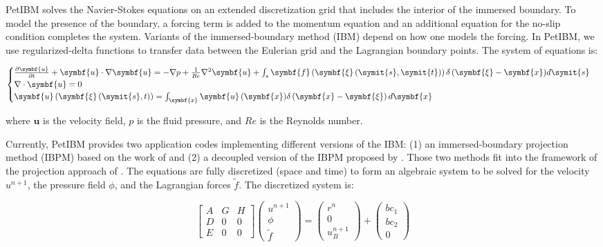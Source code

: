 PetIBM solves the Navier-Stokes equations on an extended discretization grid that includes the interior of the immersed boundary.
To model the presence of the boundary, a forcing term is added to the momentum equation and an additional equation for the no-slip condition completes the system.
Variants of the immersed-boundary method (IBM) depend on how one models the forcing.
In PetIBM, we use regularized-delta functions to transfer data between the Eulerian grid and the Lagrangian boundary points.
The system of equations is:

\begin{equation}
\begin{cases}
\frac{\partial \symbf{u}}{\partial t} + \symbf{u} \cdot \nabla \symbf{u} = -\nabla p + \frac{1}{Re} \nabla^2 \symbf{u} + \int_{s}{\symbf{f} \left( \symbf{\xi} \left( \symit{s}, \symit{t} \right) \right) \delta \left( \symbf{\xi} - \symbf{x} \right)} d\symit{s} \\
\nabla \cdot \symbf{u} = 0 \\
\symbf{u} \left( \symbf{\xi} \left( \symit{s}, t \right) \right) = \int_{\symbf{x}}{\symbf{u} \left( \symbf{x} \right)} \delta \left( \symbf{x} - \symbf{\xi} \right) d\symbf{x}
\end{cases}
\end{equation}

where $\symbf{u}$ is the velocity field, $p$ is the fluid pressure, and $Re$ is the Reynolds number.

Currently, PetIBM provides two application codes implementing different versions of the IBM: (1) an immersed-boundary projection method (IBPM) based on the work of \cite{taira_colonius_2007} and (2) a decoupled version of the IBPM proposed by \cite{li_et_al_2016}.
Those two methods fit into the framework of the projection approach of \cite{perot_1993}.
The equations are fully discretized (space and time) to form an algebraic system to be solved for the velocity $u^{n+1}$, the pressure field $\phi$, and the Lagrangian forces $\tilde{f}$.
The discretized system is:

\begin{equation}
\left[
\begin{matrix}
A & G & H \\
D & 0 & 0 \\
E & 0 & 0
\end{matrix}
\right]
\left(
\begin{matrix}
u^{n+1} \\
\phi \\
\tilde{f}
\end{matrix}
\right)
=
\left(
\begin{matrix}
r^n \\
0 \\
u_B^{n+1}
\end{matrix}
\right)
+
\left(
\begin{matrix}
bc_1 \\
bc_2 \\
0
\end{matrix}
\right)
\end{equation}

